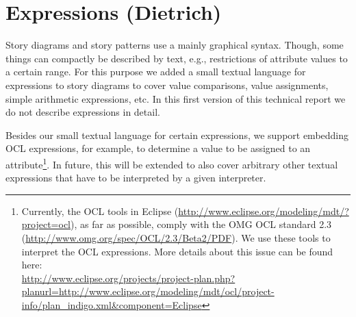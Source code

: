 \section{Expressions (Dietrich)} \label{sec:Expressions}

Story diagrams and story patterns use a mainly graphical syntax.
Though, some things can compactly be described by text, e.g., restrictions of attribute values to a certain range.
For this purpose we added a small textual language for expressions to story diagrams
to cover value comparisons, value assignments, simple arithmetic expressions, etc.
In this first version of this technical report we do not describe expressions in detail.

Besides our small textual language for certain expressions, we support embedding OCL expressions, for example, to determine a value to be assigned to an attribute\footnote{Currently,
the OCL tools in Eclipse (\href{http://www.eclipse.org/modeling/mdt/?project=ocl}{http://www.eclipse.org/modeling/mdt/?project=ocl}),
as far as possible, comply with the OMG OCL standard 2.3 (\href{http://www.omg.org/spec/OCL/2.3/Beta2/PDF}{http://www.omg.org/spec/OCL/2.3/Beta2/PDF}).
We use these tools to interpret the OCL expressions.
More details about this issue can be found here:\\ \href{http://www.eclipse.org/projects/project-plan.php?planurl=http://www.eclipse.org/modeling/mdt/ocl/project-info/plan_indigo.xml&component=Eclipse}{http://www.eclipse.org/projects/project-plan.php?planurl=http://www.eclipse.org/modeling/mdt/ocl/project-info/plan\_indigo.xml\&component=Eclipse}}.
In future, this will be extended to also cover arbitrary other textual expressions that have to be interpreted by a given interpreter.